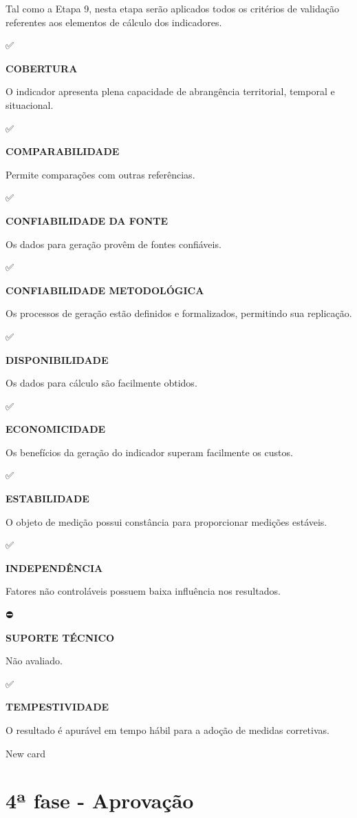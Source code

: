 \documentclass[
  letterpaper,
  DIV=11,
  numbers=noendperiod]{scrreprt}
\begin{document}
Tal como a Etapa 9, nesta etapa serão aplicados todos os critérios de
validação referentes aos elementos de cálculo dos indicadores.

✅

\textbf{COBERTURA}

O indicador apresenta plena capacidade de abrangência territorial,
temporal e situacional.

✅

\textbf{COMPARABILIDADE}

Permite comparações com outras referências.

✅

\textbf{CONFIABILIDADE DA FONTE}

Os dados para geração provêm de fontes confiáveis.

✅

\textbf{CONFIABILIDADE METODOLÓGICA}

Os processos de geração estão definidos e formalizados, permitindo sua
replicação.

✅

\textbf{DISPONIBILIDADE}

Os dados para cálculo são facilmente obtidos.

✅

\textbf{ECONOMICIDADE}

Os benefícios da geração do indicador superam facilmente os custos.

✅

\textbf{ESTABILIDADE}

O objeto de medição possui constância para proporcionar medições
estáveis.

✅

\textbf{INDEPENDÊNCIA}

Fatores não controláveis possuem baixa influência nos resultados.

⛔

\textbf{SUPORTE TÉCNICO}

Não avaliado.

✅

\textbf{TEMPESTIVIDADE}

O resultado é apurável em tempo hábil para a adoção de medidas
corretivas.

New card

\hypertarget{uxaa-fase---aprovauxe7uxe3o-1}{%
\section*{4ª fase - Aprovação}\label{uxaa-fase---aprovauxe7uxe3o-1}}
\end{document}
